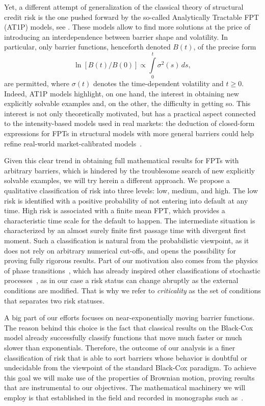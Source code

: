 \documentclass[12pt]{article}
\theoremstyle{definition}
\begin{document}
Yet, a different attempt of generalization of the classical theory of structural credit risk is the one pushed forward by the so-called Analytically Tractable FPT (AT1P) models, see \cite{brigo2009credit,molini2011first,rapisarda2005pricing}. These models allow to find more solutions at the price of introducing an interdependence between barrier shape and volatility. In particular, only barrier functions, henceforth denoted $B(t)$, of the precise form
$$
\ln[B(t)/B(0)] \propto \int\limits_0^t\sigma^2(s) \, ds,
$$
are permitted, where $\sigma(t)$ denotes the time-dependent volatility and $t \ge 0$. Indeed, AT1P models highlight, on one hand, the interest in obtaining new explicitly solvable examples and, on the other, the difficulty in getting so. This interest is not only theoretically motivated, but has a practical aspect connected to the intensity-based models used in real markets: the deduction of closed-form expressions for FPTs in structural models with more general barriers could help refine real-world market-calibrated models~\cite{duffie2001term,jarrow2012structural}.

Given this clear trend in obtaining full mathematical results for FPTs with arbitrary barriers, which is hindered by the troublesome search of new explicitly solvable examples, we will try herein a different approach. We propose a qualitative classification of risk into three levels: low, medium, and high. The low risk is identified with a positive probability of not entering into default at any time. High risk is associated with a finite mean FPT, which provides a characteristic time scale for the default to happen.  The intermediate situation is characterized by an almost surely finite first passage time with divergent first moment. Such a classification is natural from the probabilistic viewpoint, as it does not rely on arbitrary numerical cut-offs, and opens the possibility for proving fully rigorous results. Part of our motivation also comes from the physics of phase transitions~\cite{quantum2021zinn}, which has already inspired other classifications of stochastic processes~\cite{noise1984horsthemke}, as in our case a risk status can change abruptly as the external conditions are modified. That is why we refer to {\it criticality} as the set of conditions that separates two risk statuses. 

A big part of our efforts focuses on near-exponentially moving barrier functions. The reason behind this choice is the fact that classical results on the Black-Cox model already successfully classify functions that move much faster or much slower than exponentials. Therefore, the outcome of our analysis is a finer classification of risk that is able to sort barriers whose behavior is doubtful or undecidable from the viewpoint of the standard Black-Cox paradigm. To achieve this goal we will make use of the properties of Brownian motion, proving results that are instrumental to our objectives. The mathematical machinery we will employ is that established in the field and recorded in monographs such as~\cite{handbook2012borodin,karatzas1991brownian,brownian2010morters,brownian2014sp}.
\end{document}
